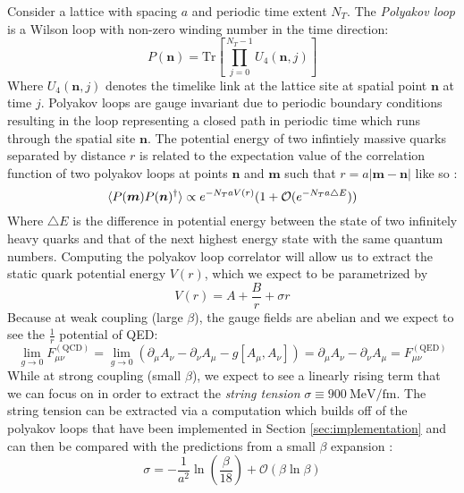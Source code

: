 \documentclass[11pt]{article}
\begin{document}
Consider a lattice with spacing $a$ and periodic time extent $N_T$. The \textit{Polyakov loop} is a Wilson loop with non-zero winding number in the time direction:
	\begin{equation}\label{eq:polyakov}P(\bm n)=\mathrm{Tr}\left[\prod_{j=0}^{N_T-1}U_4(\bm n,j)\right]\end{equation}
	Where $U_4(\bm n,j)$ denotes the timelike link at the lattice site at spatial point $\bm n$ at time $j$. Polyakov loops are gauge invariant due to periodic boundary conditions resulting in the loop representing a closed path in periodic time which runs through the spatial site $\bm n$. The potential energy of two infintiely massive quarks separated by distance $r$ is related to the expectation value of the correlation function of two polyakov loops at points $\bm n$ and $\bm m$ such that $r=a|\bm m-\bm n|$ like so \cite{gattringer_lang_2009}:
	\begin{equation}\braket{P(\bm m)P(\bm n)^\dagger}\propto e^{-N_T aV(r)}(1+\mathcal O(e^{-N_T a\triangle E}))\end{equation}
	Where $\triangle E$ is the difference in potential energy between the state of two infinitely heavy quarks and that of the next highest energy state with the same quantum numbers. Computing the polyakov loop correlator will allow us to extract the static quark potential energy $V(r)$, which we expect to be parametrized by
	\begin{equation}V(r)=A+\frac{B}{r}+\sigma r\end{equation}
	Because at weak coupling (large $\beta$), the gauge fields are abelian and we expect to see the $\frac{1}{r}$ potential of QED:
	\begin{equation}\lim_{g\to 0}F_{\mu\nu}^{(\mathrm{QCD})}=\lim_{g\to 0}\left(\partial_\mu A_\nu-\partial_\nu A_\mu-g[A_\mu,A_\nu]\right)=\partial_\mu A_\nu-\partial_\nu A_\mu=F_{\mu\nu}^{(\mathrm{QED})}\end{equation}
	While at strong coupling (small $\beta$), we expect to see a linearly rising term that we can focus on in order to extract the \textit{string tension} $\sigma\equiv 900\ \mathrm{MeV/fm}$. The string tension can be extracted via a computation which builds off of the polyakov loops that have been implemented in Section \ref{sec:implementation} and can then be compared with the predictions from a small $\beta$ expansion \cite{gattringer_lang_2009}:
	\begin{equation}\sigma=-\frac{1}{a^2}\ln\left(\frac{\beta}{18}\right)+\mathcal O(\beta\ln\beta)\end{equation}
\end{document}
